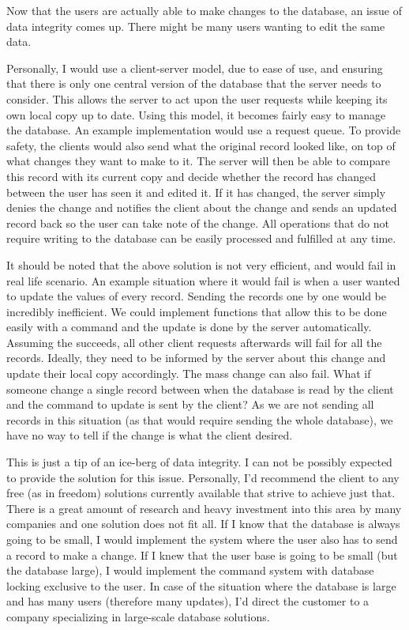\documentclass{report}
\begin{document}
Now that the users are actually able to make changes to the database, an issue of data integrity comes up. There might be many users wanting to edit the same data.

Personally, I would use a client-server model, due to ease of use, and ensuring that there is only one central version of the database that the server needs to consider. This allows the server to act upon the user requests while keeping its own local copy up to date.
Using this model, it becomes fairly easy to manage the database. An example implementation would use a request queue. To provide safety, the clients would also send what the original record looked like, on top of what changes they want to make to it. The server will then be able to compare this record with its current copy and decide whether the record has changed between the user has seen it and edited it. If it has changed, the server simply denies the change and notifies the client about the change and sends an updated record back so the user can take note of the change. All operations that do not require writing to the database can be easily processed and fulfilled at any time.

It should be noted that the above solution is not very efficient, and would fail in real life scenario. An example situation where it would fail is when a user wanted to update the values of every record. Sending the records one by one would be incredibly inefficient. We could implement functions that allow this to be done easily with a command and the update is done by the server automatically. Assuming the succeeds, all other client requests afterwards will fail for all the records. Ideally, they need to be informed by the server about this change and update their local copy accordingly. The mass change can also fail. What if someone change a single record between when the database is read by the client and the command to update is sent by the client? As we are not sending all records in this situation (as that would require sending the whole database), we have no way to tell if the change is what the client desired.

This is just a tip of an ice-berg of data integrity. I can not be possibly expected to provide the solution for this issue. Personally, I'd recommend the client to any free (as in freedom) solutions currently available that strive to achieve just that. There is a great amount of research and heavy investment into this area by many companies and one solution does not fit all. If I know that the database is always going to be small, I would implement the system where the user also has to send a record to make a change. If I knew that the user base is going to be small (but the database large), I would implement the command system with database locking exclusive to the user. In case of the situation where the database is large and has many users (therefore many updates), I'd direct the customer to a company specializing in large-scale database solutions.
\end{document}
